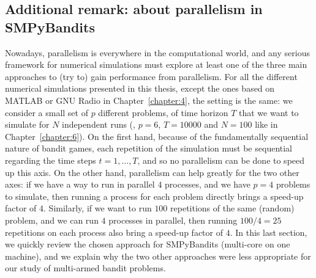 {%
\begin{listing}[h!]
    \begin{verbatim}
$ for N in 4 100 1000; do \
  for BAYES in False True; do\
  for T in 1000 5000 10000 50000; do \
  for K in 2 5 10 20 50; do \
    DEBUG=False NOPLOTS=False SAVEALL=True N_JOBS=-1 \
             N=$N BAYES=$BAYES T=$T K=$K make single \
    && cp logs/main_py3_log.txt logs/main_py3_log__N${N}_BAYES${BAYES}_T{T}_K{K}.txt \
  done; done; done; done
    \end{verbatim}
    \caption{Snippet of Bash code to run the large experiments presented in Sections~\ref{sec:3:reviewSPAlgorithms} and \ref{sub:3:additionalExperiments}.
    \label{lst:3:BashCodeToLaunchLargeExperiments}
\end{listing}


\subsection{Additional remark: about parallelism in SMPyBandits}
\label{sub:3:parallelSimulations}


Nowadays, parallelism is everywhere in the computational world, and any serious framework for numerical simulations must explore at least one of the three main approaches to (try to) gain performance from parallelism.
%
For all the different numerical simulations presented in this thesis, except the ones based on MATLAB or GNU Radio in Chapter~\ref{chapter:4}, the setting is the same: we consider a small set of $p$ different problems, of time horizon $T$ that we want to simulate for $N$ independent runs (\eg, $p=6$, $T=10000$ and $N=100$ like in Chapter~\ref{chapter:6}).
On the first hand, because of the fundamentally sequential nature of bandit games, each repetition of the simulation must be sequential regarding the time steps $t=1,\dots,T$, and so no parallelism can be done to speed up this axis.
On the other hand, parallelism can help greatly for the two other axes: if we have a way to run in parallel $4$ processes, and we have $p=4$ problems to simulate, then running a process for each problem directly brings a speed-up factor of $4$.
Similarly, if we want to run $100$ repetitions of the same (random) problem, and we can run $4$ processes in parallel, then running $100/4=25$ repetitions on each process also bring a speed-up factor of $4$.
%
In this last section, we quickly review the chosen approach for SMPyBandits (multi-core on one machine), and we explain why the two other approaches were less appropriate for our study of multi-armed bandit problems.

}
